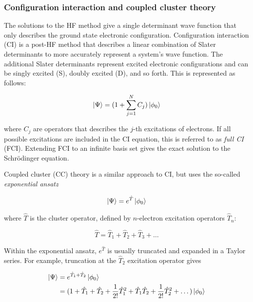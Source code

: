 \subsubsection{Configuration interaction and coupled cluster theory}

The solutions to the HF method give a single determinant wave function that
only describes the ground state electronic configuration. Configuration
interaction (CI) is a post-HF method that describes a linear combination of
Slater determinants to more accurately represent a system's wave function. The
additional Slater determinants represent excited electronic configurations and
can be singly excited (S), doubly excited (D), and so forth. This is
represented as follows:

\begin{equation}
  \ket{\Psi} = (1+\sum_{j=1}^N C_j) \ket{\phi_0}
\end{equation}

\noindent where $C_j$ are operators that describes the $j$-th excitations of
electrons. If all possible excitations are included in the CI equation, this is
referred to as \emph{full CI} (FCI). Extending FCI to an infinite basis set
gives the exact solution to the Schr{\"o}dinger equation.

Coupled cluster (CC) theory\cite{Crawford2000} is a similar approach to CI, but
uses the so-called \emph{exponential ansatz}

\begin{equation}
  \ket{\Psi} = e^{\hat{T}}\ket{\phi_0}
\end{equation}

\noindent where $\hat{T}$ is the cluster operator, defined by $n$-electron
excitation operators $\hat{T}_n$:

\begin{equation}
  \hat{T} = \hat{T}_1 + \hat{T}_2 + \hat{T}_3 + \dots
\end{equation}

Within the exponential ansatz, $e^{\hat{T}}$ is usually truncated and expanded
in a Taylor series. For example, truncation at the $\hat{T}_2$ excitation
operator gives

\begin{equation}
\begin{split}
  \ket{\Psi} &= e^{\hat{T}_1+\hat{T}_2}\ket{\phi_0} \\
  &= (1 + \hat{T}_1 + \hat{T}_2 +  \frac{1}{2!}\hat{T}_1^2 + \hat{T}_1\hat{T}_2 + \frac{1}{2!}\hat{T}_2^2 + \dots)
  \ket{\phi_0}
\end{split}
\end{equation}


